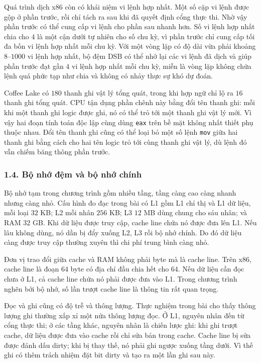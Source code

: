 \documentclass[11pt]{article}
\begin{document}
Quá trình dịch x86 còn có khái niệm vi lệnh hợp nhất. Một số cặp vi lệnh được
gộp ở phần trước, rồi chỉ tách ra sau khi đã quyết định cổng thực thi. Nhờ vậy
phần trước có thể cung cấp vi lệnh cho phần sau nhanh hơn. Số vi lệnh hợp nhất
chia cho \(4\) là một cận dưới tự nhiên cho số chu kỳ, vì phần trước chỉ cung
cấp tối đa bốn vi lệnh hợp nhất mỗi chu kỳ. Với một vòng lặp có độ dài vừa phải
khoảng \(8\)--\(1000\) vi lệnh hợp nhất, bộ đệm DSB có thể nhớ lại các vi lệnh
đã dịch và giúp phần trước đạt gần \(4\) vi lệnh hợp nhất mỗi chu kỳ, miễn là
vòng lặp không chứa lệnh quá phức tạp như chia và không có nhảy thực sự khó
dự đoán.

Coffee Lake có \(180\) thanh ghi vật lý tổng quát, trong khi hợp ngữ chỉ lộ ra
\(16\) thanh ghi tổng quát. CPU tận dụng phần chênh này bằng đổi tên thanh ghi:
mỗi khi một thanh ghi logic được ghi, nó có thể trỏ tới một thanh ghi vật lý
mới. Vì vậy hai đoạn tính toán độc lập cùng dùng \texttt{eax} trên bề mặt không
nhất thiết phụ thuộc nhau. Đổi tên thanh ghi cũng có thể loại bỏ một số lệnh
\texttt{mov} giữa hai thanh ghi bằng cách cho hai tên logic trỏ tới cùng thanh
ghi vật lý, dù lệnh đó vẫn chiếm băng thông phần trước.

\subsubsection*{1.4. Bộ nhớ đệm và bộ nhớ chính}

Bộ nhớ tạm trong chương trình gồm nhiều tầng, tầng càng cao càng nhanh nhưng
càng nhỏ. Cấu hình đo đạc trong bài có L1 gồm L1 chỉ thị và L1 dữ liệu, mỗi
loại \(32\) KB; L2 mỗi nhân \(256\) KB; L3 \(12\) MB dùng chung cho sáu nhân;
và RAM \(32\) GB. Khi dữ liệu được truy cập, cache line chứa nó được đưa lên
L1. Nếu lâu không dùng, nó dần bị đẩy xuống L2, L3 rồi bộ nhớ chính. Do đó dữ
liệu càng được truy cập thường xuyên thì chi phí trung bình càng nhỏ.

Đơn vị trao đổi giữa cache và RAM không phải byte mà là cache line. Trên x86,
cache line là đoạn \(64\) byte có địa chỉ đầu chia hết cho \(64\). Nếu dữ liệu
cần đọc chưa ở L1, cả cache line chứa nó phải được đưa vào L1. Trong chương
trình nghẽn bởi bộ nhớ, số lần trượt cache line là thông tin rất quan trọng.

Đọc và ghi cũng có độ trễ và thông lượng. Thực nghiệm trong bài cho thấy thông
lượng ghi thường xấp xỉ một nửa thông lượng đọc. Ở L1, nguyên nhân đến từ cổng
thực thi; ở các tầng khác, nguyên nhân là chiến lược ghi: khi ghi trượt cache,
dữ liệu được đưa vào cache rồi chỉ sửa bản trong cache. Cache line bị sửa được
đánh dấu dirty; khi bị thay thế, nó phải ghi ngược xuống tầng dưới. Vì thế ghi
có thêm trách nhiệm đặt bit dirty và tạo ra một lần ghi sau này.
\end{document}
